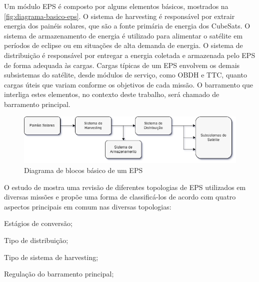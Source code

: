 Um módulo \gls{EPS} é composto por alguns elementos básicos, mostrados na \autoref{fig:diagrama-basico-eps}.
O sistema de harvesting é responsável por extrair energia dos painéis solares, que são a fonte primária de energia dos CubeSats.
O sistema de armazenamento de energia é utilizado para alimentar o satélite em períodos de eclipse ou em situações de alta demanda de energia.
O sistema de distribuição é responsável por entregar a energia coletada e armazenada pelo \gls{EPS} de forma adequada às cargas.
Cargas típicas de um \gls{EPS} envolvem os demais subsistemas do satélite, desde módulos de serviço, como \gls{OBDH} e \gls{TTC}, quanto cargas úteis que variam conforme os objetivos de cada missão.
O barramento que interliga estes elementos, no contexto deste trabalho, será chamado de barramento principal.

\begin{figure}[htp]
    \caption{Diagrama de blocos básico de um EPS}
    \begin{center}
        \includegraphics[width=\textwidth, keepaspectratio]{images/basic-eps-block-diagram.png}
    \end{center}
    \label{fig:diagrama-basico-eps}
\end{figure}


O estudo de \textcite{comprehensive-review-eps} mostra uma revisão de diferentes topologias de \gls{EPS} utilizados em diversas missões e propõe uma forma de classificá-los de acordo com quatro aspectos principais em comum nas diversas topologias:

\vspace{1mm}
\begin{alineas}
    \item Estágios de conversão;
    \item Tipo de distribuição; %
    \item Tipo de sistema de harvesting;%
    \item Regulação do barramento principal;%
\end{alineas}
\vspace{3mm}

